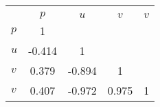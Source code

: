 \begin{tabular}{l*{4}{c}}
\toprule
                &\multicolumn{4}{c}{}                   \\
                &    $ p $&    $ u $&    $ v $&    $ v $\\
\midrule
$ p $           &        1&         &         &         \\
$ u $           &   -0.414&        1&         &         \\
$ v $           &    0.379&   -0.894&        1&         \\
$ v $           &    0.407&   -0.972&    0.975&        1\\
\bottomrule
\end{tabular}
